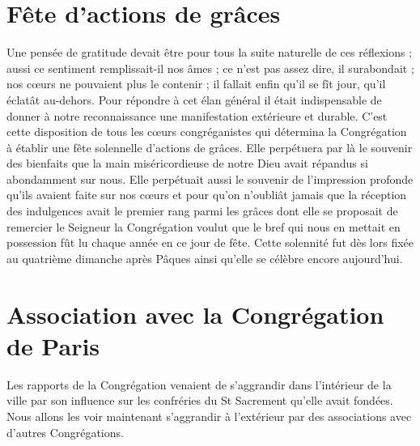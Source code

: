 \section*{Fête d'actions de grâces}
Une pensée de gratitude devait être pour tous la suite naturelle de ces réflexions ; aussi ce sentiment remplissait-il nos âmes ; ce n'est pas assez dire, il surabondait ; nos cœurs ne pouvaient plus le contenir ; il fallait enfin qu'il se fît jour, qu'il éclatât au-dehors. Pour répondre à cet élan général il était indispensable de donner à notre reconnaissance une manifestation extérieure et durable. C'est cette disposition de tous les cœurs congréganistes qui détermina la Congrégation à établir une fête solennelle d'actions de grâces. Elle perpétuera par là le souvenir des bienfaits que la main miséricordieuse de notre Dieu avait répandus si abondamment sur nous. Elle perpétuait aussi le souvenir de l'impression profonde
qu'ils avaient faite sur nos cœurs et pour qu'on n'oubliât jamais que la réception des indulgences avait le premier rang parmi les grâces dont elle se proposait de remercier le Seigneur la Congrégation voulut que le bref qui nous en mettait en possession fût lu chaque année en ce jour de fête. Cette solennité fut dès lors fixée au quatrième dimanche après Pâques ainsi qu'elle se célèbre encore aujourd'hui.

\section*{Association avec la Congrégation de Paris}
Les rapports de la Congrégation venaient de s'aggrandir dans l'intérieur de la ville par son influence sur les confréries du St Sacrement qu'elle avait fondées. Nous allons les voir maintenant s'aggrandir à l'extérieur par des associations avec d'autres Congrégations.

